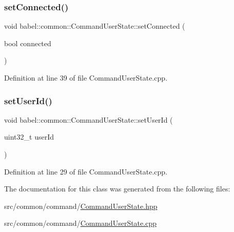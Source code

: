 \subsubsection{\texorpdfstring{set\+Connected()}{setConnected()}}
{\footnotesize\ttfamily void babel\+::common\+::\+Command\+User\+State\+::set\+Connected (\begin{DoxyParamCaption}\item[{bool}]{connected }\end{DoxyParamCaption})}



Definition at line 39 of file Command\+User\+State.\+cpp.

\mbox{\label{classbabel_1_1common_1_1_command_user_state_a8daf12c220d8d2cd8bed4cdbc7b0e5b9}} 
\subsubsection{\texorpdfstring{set\+User\+Id()}{setUserId()}}
{\footnotesize\ttfamily void babel\+::common\+::\+Command\+User\+State\+::set\+User\+Id (\begin{DoxyParamCaption}\item[{uint32\+\_\+t}]{user\+Id }\end{DoxyParamCaption})}



Definition at line 29 of file Command\+User\+State.\+cpp.



The documentation for this class was generated from the following files\+:\begin{DoxyCompactItemize}
\item 
src/common/command/\mbox{\hyperlink{_command_user_state_8hpp}{Command\+User\+State.\+hpp}}\item 
src/common/command/\mbox{\hyperlink{_command_user_state_8cpp}{Command\+User\+State.\+cpp}}\end{DoxyCompactItemize}
